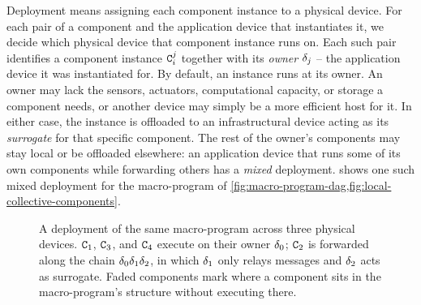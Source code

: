 Deployment means assigning each component instance to a physical device.
%
For each pair of a component and the application device that instantiates it, we decide which physical device that component instance runs on.
%
Each such pair identifies a component instance $\mathtt{C}_i^j$ together with its \emph{owner} $\delta_j$ -- the application device it was instantiated for.
%
By default, an instance runs at its owner.
%
An owner may lack the sensors, actuators, computational capacity, or storage a component needs, or another device may simply be a more efficient host for it.
In either case, the instance is offloaded to an infrastructural device acting as its \emph{surrogate} for that specific component.
The rest of the owner's components may stay local or be offloaded elsewhere:
an application device that runs some of its own components while forwarding others has a \emph{mixed} deployment.
%
 shows one such mixed deployment for the macro-program of \cref{fig:macro-program-dag,fig:local-collective-components}.

\begin{figure}[t]
    \centering
    \resizebox{\textwidth}{!}{}
    \caption[A macro-program deployed along a two-hop forwarding chain]{A deployment of the same macro-program across three physical devices. $\mathtt{C}_1$, $\mathtt{C}_3$, and $\mathtt{C}_4$ execute on their owner $\delta_0$; $\mathtt{C}_2$ is forwarded along the chain $\delta_0\delta_1\delta_2$, in which $\delta_1$ only relays messages and $\delta_2$ acts as surrogate. Faded components mark where a component sits in the macro-program's structure without executing there.}
    \label{fig:pulverization-forwarding}
\end{figure}

